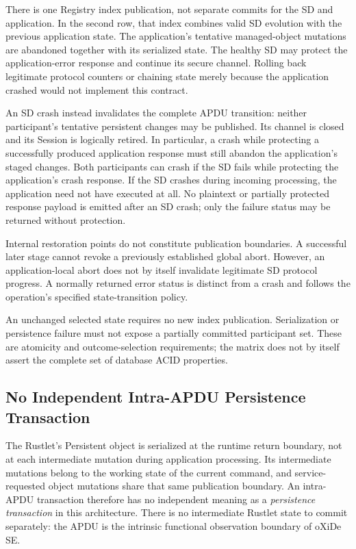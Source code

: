 There is one Registry index publication, not separate commits for the SD and
application. In the second row, that index combines valid SD evolution with
the previous application state. The application's tentative managed-object
mutations are abandoned together with its serialized state. The healthy SD
may protect the application-error response and continue its secure channel.
Rolling back legitimate protocol counters or chaining state merely because
the application crashed would not implement this contract.

An SD crash instead invalidates the complete APDU transition: neither
participant's tentative persistent changes may be published. Its channel is
closed and its Session is logically retired. In particular, a crash while
protecting a successfully produced application response must still abandon
the application's staged changes. Both participants can crash if the SD fails
while protecting the application's crash response. If the SD crashes during
incoming processing, the application need not have executed at all. No
plaintext or partially protected response payload is emitted after an SD
crash; only the failure status may be returned without protection.

Internal restoration points do not constitute publication boundaries. A
successful later stage cannot revoke a previously established global abort.
However, an application-local abort does not by itself invalidate legitimate
SD protocol progress. A normally returned error status is distinct from a
crash and follows the operation's specified state-transition policy.

An unchanged selected state requires no new index publication. Serialization
or persistence failure must not expose a partially committed participant
set. These are atomicity and outcome-selection requirements; the matrix does
not by itself assert the complete set of database ACID properties.

\subsection{No Independent Intra-APDU Persistence Transaction}

The Rustlet's Persistent object is serialized at the runtime return boundary,
not at each intermediate mutation during application processing. Its
intermediate mutations belong to the working state of the current command,
and service-requested object mutations share that same publication boundary.
An intra-APDU transaction therefore has no independent meaning as a
\emph{persistence transaction} in this architecture. There is no intermediate
Rustlet state to commit separately: the APDU is the intrinsic functional
observation boundary of oXiDe SE.

